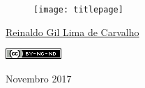 \thispagestyle{empty}

\begin{center}
  \begin{figure}[H]
    \begin{center}
      \hspace{-1cm}
      \texttt{[image: titlepage]}
  ~\cite{FrontPageIMG}
    \end{center}      
  \end{figure}

  \vskip 2cm

  \hspace{-1cm}
  \begin{minipage}[c]{17cm}
    \begin{center}

{\huge {}\vskip 0.15cm %

{\large \href{https://www.linkedin.com/in/reinaldo-gil-lima-de-carvalho/}{Reinaldo Gil Lima de Carvalho}} %

{\includegraphics[width=0.1\columnwidth]{imgs/license-CC-BY-NC-ND_header.png}}

}
    \end{center}
  \end{minipage}

  \vskip 14cm

  {\huge Novembro 2017} %
\end{center}
